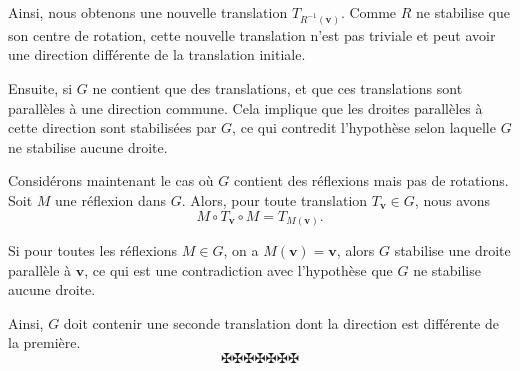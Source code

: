 Ainsi, nous obtenons une nouvelle translation $T_{R^{- 1} (\mathbf{v})}$.
Comme $R$ ne stabilise que son centre de rotation, cette nouvelle translation
n'est pas triviale et peut avoir une direction diff{\'e}rente de la
translation initiale.

Ensuite, si $G$ ne contient que des translations, et que ces translations sont
parall{\`e}les {\`a} une direction commune. Cela implique que les droites
parall{\`e}les {\`a} cette direction sont stabilis{\'e}es par $G$, ce qui
contredit l'hypoth{\`e}se selon laquelle $G$ ne stabilise aucune droite.

Consid{\'e}rons maintenant le cas o{\`u} $G$ contient des r{\'e}flexions mais
pas de rotations. Soit $M$ une r{\'e}flexion dans $G$. Alors, pour toute
translation $T_{\mathbf{v}} \in G$, nous avons
\[ M \circ T_{\mathbf{v}} \circ M = T_{M (\mathbf{v})} . \]


Si pour toutes les r{\'e}flexions $M \in G$, on a $M (\mathbf{v}) =
\mathbf{v}$, alors $G$ stabilise une droite parall{\`e}le {\`a} $\mathbf{v}$,
ce qui est une contradiction avec l'hypoth{\`e}se que $G$ ne stabilise aucune
droite.

Ainsi, $G$ doit contenir une seconde translation dont la direction est
diff{\'e}rente de la premi{\`e}re.
\[ \maltese \maltese \maltese \maltese \maltese \maltese \maltese \]
